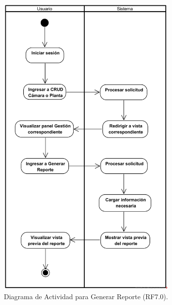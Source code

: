 \begin{figure}[H]
	\centering
		\caption{Diagrama de Actividad para Generar Reporte (RF7.0).}
	\includegraphics[width=0.8\textwidth]{UML/Actividad/Diagrama de Actividad RF7.0 Generar Reporte.png}
\end{figure}


